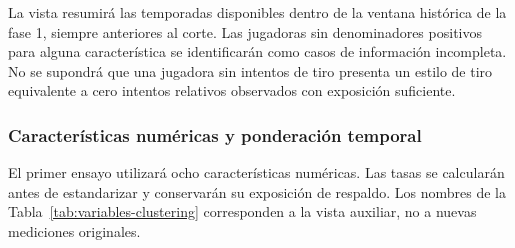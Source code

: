 La vista resumirá las temporadas disponibles dentro de la ventana histórica de la fase 1, siempre anteriores al corte. Las jugadoras sin denominadores positivos para alguna característica se identificarán como casos de información incompleta. No se supondrá que una jugadora sin intentos de tiro presenta un estilo de tiro equivalente a cero intentos relativos observados con exposición suficiente.

\subsubsection*{Características numéricas y ponderación temporal}
El primer ensayo utilizará ocho características numéricas. Las tasas se calcularán antes de estandarizar y conservarán su exposición de respaldo. Los nombres de la Tabla~\ref{tab:variables-clustering} corresponden a la vista auxiliar, no a nuevas mediciones originales.

